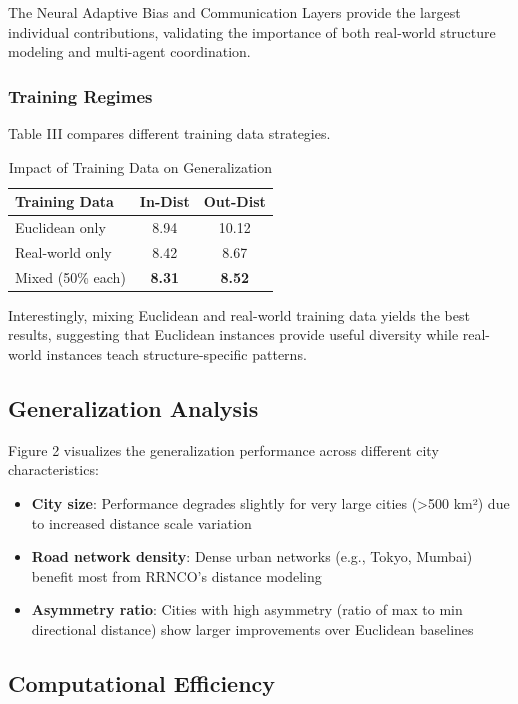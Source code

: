 \documentclass[lettersize,journal]{IEEEtran}
\begin{document}
The Neural Adaptive Bias and Communication Layers provide the largest individual contributions, validating the importance of both real-world structure modeling and multi-agent coordination.

\subsubsection{Training Regimes}

Table III compares different training data strategies.

\begin{table}[h]
\centering
\caption{Impact of Training Data on Generalization}
\begin{tabular}{lcc}
\toprule
\textbf{Training Data} & \textbf{In-Dist} & \textbf{Out-Dist} \\
\midrule
Euclidean only & 8.94 & 10.12 \\
Real-world only & 8.42 & 8.67 \\
Mixed (50\% each) & \textbf{8.31} & \textbf{8.52} \\
\bottomrule
\end{tabular}
\end{table}

Interestingly, mixing Euclidean and real-world training data yields the best results, suggesting that Euclidean instances provide useful diversity while real-world instances teach structure-specific patterns.

\subsection{Generalization Analysis}

Figure 2 visualizes the generalization performance across different city characteristics:

\begin{itemize}
\item \textbf{City size}: Performance degrades slightly for very large cities (>500 km²) due to increased distance scale variation
\item \textbf{Road network density}: Dense urban networks (e.g., Tokyo, Mumbai) benefit most from RRNCO's distance modeling
\item \textbf{Asymmetry ratio}: Cities with high asymmetry (ratio of max to min directional distance) show larger improvements over Euclidean baselines
\end{itemize}

\subsection{Computational Efficiency}
\end{document}
